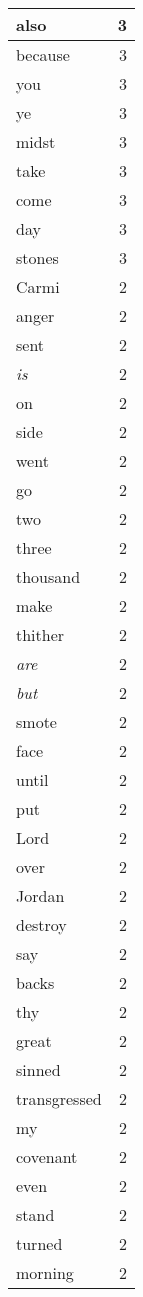 \begin{center}
\begin{longtable}{l|r}
also & 3\\ \hline 
because & 3\\ \hline 
you & 3\\ \hline 
ye & 3\\ \hline 
midst & 3\\ \hline 
take & 3\\ \hline 
come & 3\\ \hline 
day & 3\\ \hline 
stones & 3\\ \hline 
Carmi & 2\\ \hline 
anger & 2\\ \hline 
sent & 2\\ \hline 
\emph{is} & 2\\ \hline 
on & 2\\ \hline 
side & 2\\ \hline 
went & 2\\ \hline 
go & 2\\ \hline 
two & 2\\ \hline 
three & 2\\ \hline 
thousand & 2\\ \hline 
make & 2\\ \hline 
thither & 2\\ \hline 
\emph{are} & 2\\ \hline 
\emph{but} & 2\\ \hline 
smote & 2\\ \hline 
face & 2\\ \hline 
until & 2\\ \hline 
put & 2\\ \hline 
Lord & 2\\ \hline 
over & 2\\ \hline 
Jordan & 2\\ \hline 
destroy & 2\\ \hline 
say & 2\\ \hline 
backs & 2\\ \hline 
thy & 2\\ \hline 
great & 2\\ \hline 
sinned & 2\\ \hline 
transgressed & 2\\ \hline 
my & 2\\ \hline 
covenant & 2\\ \hline 
even & 2\\ \hline 
stand & 2\\ \hline 
turned & 2\\ \hline 
morning & 2\\ \hline 

\end{longtable}
\end{center}
